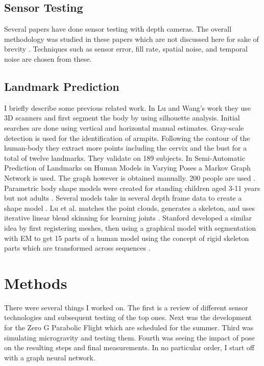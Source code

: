 \section{Sensor Testing}
Several papers have done sensor testing with depth cameras. The overall methodology was studied in these papers which are not discussed here for sake of brevity\cite{sophian2017evaluation} \cite{khoshelham2012accuracy} \cite{langmann2012depth} \cite{sankowski2017estimation}. Techniques such as sensor error, fill rate, spatial noise, and temporal noise are chosen from these.


\section{Landmark Prediction}
I briefly describe some previous related work. In Lu and Wang's work \cite{lu2008automated} they use 3D scanners and first segment the body by using silhouette analysis. Initial searches are done using vertical and horizontal manual estimates. Gray-scale detection is used for the identification of armpits. Following the contour of the human-body they extract more points including the cervix and the bust for a total of twelve landmarks. They validate on 189 subjects. In Semi-Automatic Prediction of Landmarks on Human Models in Varying Poses a Markov Graph Network is used. The graph however is obtained manually. 200 people are used \cite{wuhrer2010semi}. Parametric body shape models were created for standing children aged 3-11 years but not adults \cite{park2015parametric}. Several models take in several depth frame data to create a shape model \cite{deng2019neural}. Lu et al. matches the point clouds, generates a skeleton, and uses iterative linear blend skinning for learning joints \cite{lu20193D}. Stanford developed a similar idea by first registering meshes, then using a graphical model with segmentation with EM to get 15 parts of a human model using the concept of rigid skeleton parts which are transformed across sequences \cite{anguelov2012recovering}.


\chapter{Methods}
There were several things I worked on. The first is a review of different sensor technologies and subsequent testing of the top ones. Next was the development for the Zero G Parabolic Flight which are scheduled for the summer. Third was simulating microgravity and testing them. Fourth was seeing the impact of pose on the resulting steps and final measurements. In no particular order, I start off with a graph neural network.


